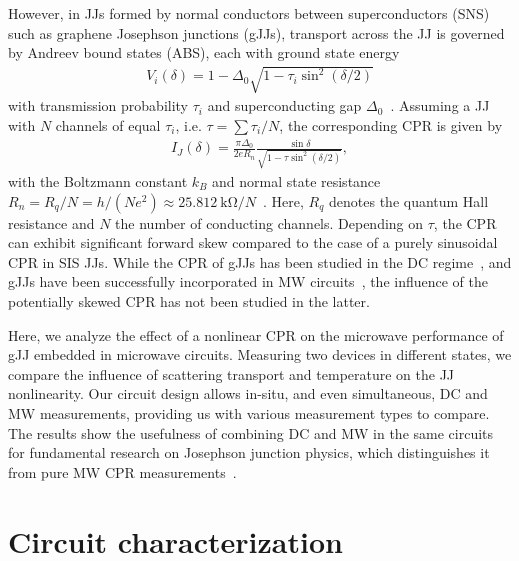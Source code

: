 However, in JJs formed by normal conductors between superconductors (SNS) such as graphene Josephson junctions (gJJs), transport across the JJ is governed by Andreev bound states (ABS), each with ground state energy
\begin{align}
V_i(\delta)=1-\Delta_0\sqrt{1-\tau_i\sin^2(\delta/2)}
\label{eq:ABSenergy}
\end{align}
%
with transmission probability $\tau_i$ and superconducting gap $\Delta_0$~\cite{beenakkerUniversalLimitCriticalcurrent1991,titovJosephsonEffectBallistic2006b}.
%
Assuming a JJ with $N$ channels of equal $\tau_i$, i.e. $\tau=\sum\tau_i/N$, the corresponding CPR is given by
\begin{align}
I_J(\delta) = \frac{\pi\Delta_0}{2 e R_n} \frac{\sin\delta}{\sqrt{1 - \tau \sin^2(\delta / 2)}},
\label{eq:CPR-ball}
\end{align}
%
with the Boltzmann constant $k_B$ and normal state resistance $R_n= R_q/N = h/(Ne^2)\approx \SI{25.812}{\kilo\ohm} / N$~\cite{golubovCurrentphaseRelationJosephson2004a,leeUltimatelyShortBallistic2015}.
%
Here, $R_q$ denotes the quantum Hall resistance and $N$ the number of conducting channels.
%
Depending on $\tau$, the CPR can exhibit significant forward skew compared to the case of a purely sinusoidal CPR in SIS JJs.
%
While the CPR of gJJs has been studied in the DC regime~\cite{englishObservationNonsinusoidalCurrentphase2016,nandaCurrentPhaseRelationBallistic2017}, and gJJs have been successfully incorporated in MW circuits~\cite{schmidtBallisticGrapheneSuperconducting2018,krollMagneticFieldCompatible2018,wangCoherentControlHybrid2019}, the influence of the potentially skewed CPR has not been studied in the latter.

Here, we analyze the effect of a nonlinear CPR on the microwave performance of gJJ embedded in microwave circuits.
%
Measuring two devices in different states, we compare the influence of scattering transport and temperature on the JJ nonlinearity.
%
Our circuit design allows in-situ, and even simultaneous, DC and MW measurements, providing us with various measurement types to compare.
%
The results show the usefulness of combining DC and MW in the same circuits for fundamental research on Josephson junction physics, which distinguishes it from pure MW CPR measurements~\cite{rifkinCurrentphaseRelationPhasedependent1976}.

\section{Circuit characterization}

